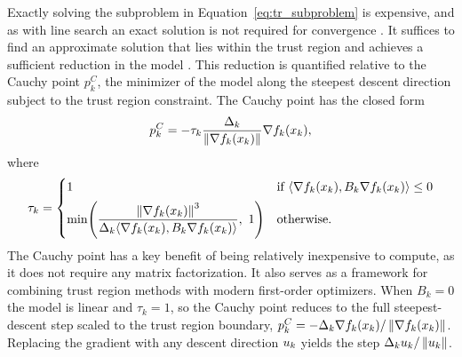   Exactly solving the subproblem in Equation~\eqref{eq:tr_subproblem} is expensive, and as with line search an exact solution is not required for convergence \cite{nocedal2006numerical}. It suffices to find an approximate solution that lies within the trust region and achieves a sufficient reduction in the model \cite{nocedal2006numerical}. This reduction is quantified relative to the Cauchy point $p_k^C$, the minimizer of the model along the steepest descent direction subject to the trust region constraint. The Cauchy point has the closed form
  \begin{equation}
      p_k^C = -\tau_k \frac{\Delta_k}{\left \lVert \nabla f_k(x_{k}) \right \rVert} \nabla f_k(x_{k}),
      \label{eq:cauchy_point}
  \end{equation}
  where
  \begin{equation}
      \tau_k =
      \begin{cases}
          1 & \text{if } \langle \nabla f_k(x_{k}), B_k \nabla f_k(x_{k}) \rangle \le 0 \\[4pt]
          \min\!\left( \dfrac{\left \lVert \nabla f_k(x_{k}) \right \rVert^3}{\Delta_k \langle \nabla f_k(x_{k}), B_k \nabla f_k(x_{k}) \rangle},\ 1 \right) & \text{otherwise.}
      \end{cases}
      \label{eq:cauchy_tau}
  \end{equation}
  The Cauchy point has a key benefit of being relatively inexpensive to compute, as it does not require any matrix factorization. It also serves as a framework for combining trust region methods with modern first-order optimizers. When $B_k = 0$ the model is linear and $\tau_k = 1$, so the Cauchy point reduces to the full steepest-descent step scaled to the trust region boundary, $p_k^C = -\Delta_k \nabla f_k(x_{k}) / \left \lVert \nabla f_k(x_{k}) \right \rVert$. Replacing the gradient with any descent direction $u_{k}$ yields the step $\Delta_k u_{k} / \left \lVert u_{k} \right \rVert$.

  \renewcommand{\bibname}{References}
  
  
  
